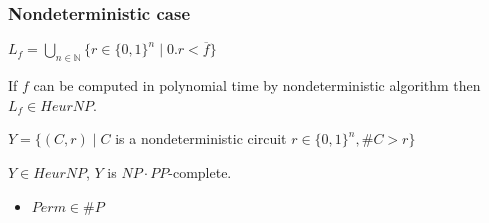 \begin{frame}
    \frametitle{Nondeterministic case}

    $L_f = \bigcup\limits_{n \in \mathbb{N}}\{r \in \{0, 1\}^n \mid 0.r <
    \overline{f}\}$

    \begin{lemma}
        If $f$ can be computed in polynomial time by nondeterministic
        algorithm then $L_f \in HeurNP$.
    \end{lemma}
    
	$Y = \{(C, r) \mid C$ is a nondeterministic circuit $r \in \{0,
    1\}^n, \#C > r\}$
    
    \begin{lemma}
        $Y \in HeurNP$, $Y$ is $NP \cdot PP$-complete.
    \end{lemma}

    \begin{itemize}
	    \item $Perm \in \#P$
    \end{itemize}
    
\end{frame}